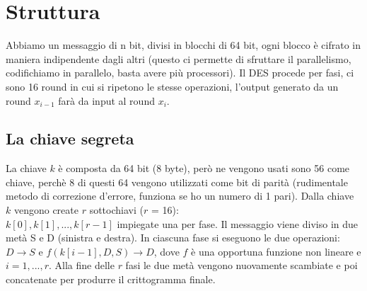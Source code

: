 \section{Struttura}

Abbiamo un messaggio di n bit, divisi in blocchi di 64 bit, ogni blocco è cifrato in maniera indipendente dagli altri (questo ci permette di sfruttare il parallelismo, codifichiamo in parallelo, basta avere più processori). Il DES procede per fasi, ci sono 16 round in cui si ripetono le stesse operazioni, l'output generato da un round $x_{i-1}$ farà da input al round $x_i$.
\subsection{La chiave segreta}

La chiave $k$ è composta da 64 bit (8 byte), però ne vengono usati sono 56 come chiave, perchè 8 di questi 64 vengono utilizzati come bit di parità (rudimentale metodo di correzione d'errore, funziona se ho un numero di 1 pari). Dalla chiave $k$ vengono create $r$ sottochiavi ($r$ = 16):\\
$k[0], k[1], ..., k[r-1]$ impiegate una per fase.
Il messaggio viene diviso in due metà S e D (sinistra e destra). In ciascuna fase si eseguono le due operazioni: $D \rightarrow S$ e $f(k[i - 1], D, S) \rightarrow D$, dove $f$ è una opportuna funzione non lineare e $i = 1, ..., r$. Alla fine delle $r$ fasi le due metà vengono nuovamente scambiate e poi concatenate per produrre il crittogramma
finale.

